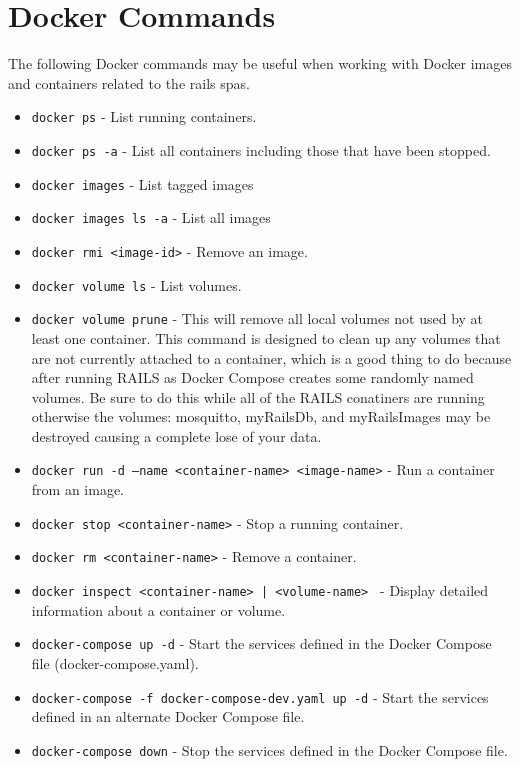 \chapter{Docker Commands}
\label{app:dockercommands}
The following Docker commands may be useful when working with Docker images and containers related to the \gls{rails} \glspl{spa}.
\begin{itemize}
    \item \texttt{docker ps} - List running containers.
    \item \texttt{docker ps -a} - List all containers including those that have been stopped.
    \item \texttt{docker images} - List tagged images
    \item \texttt{docker images ls -a} - List all images
    \item \texttt{docker rmi <image-id>} - Remove an image.
    \item \texttt{docker volume ls} - List volumes.
    \item \texttt{docker volume prune} - This will remove all local volumes not used by at least one container. This command is designed to clean up any volumes that are not currently attached to a container, which is a good thing to do because after running RAILS as Docker Compose creates some randomly named volumes. Be sure to do this while all of the RAILS conatiners are running otherwise the volumes: mosquitto, myRailsDb, and myRailsImages may be destroyed causing a complete lose of your data.
    \item \texttt{docker run -d --name <container-name> <image-name>} - Run a container from an image.
    \item \texttt{docker stop <container-name>} - Stop a running container.
    \item \texttt{docker rm <container-name>} - Remove a container.
    \item \texttt{docker inspect <container-name> | <volume-name> } - Display detailed information about a container or volume.
    \item \texttt{docker-compose up -d} - Start the services defined in the Docker Compose file (docker-compose.yaml).
    \item \texttt{docker-compose -f docker-compose-dev.yaml up -d} - Start the services defined in an alternate Docker Compose file.
    \item \texttt{docker-compose down} - Stop the services defined in the Docker Compose file.
\end{itemize}
